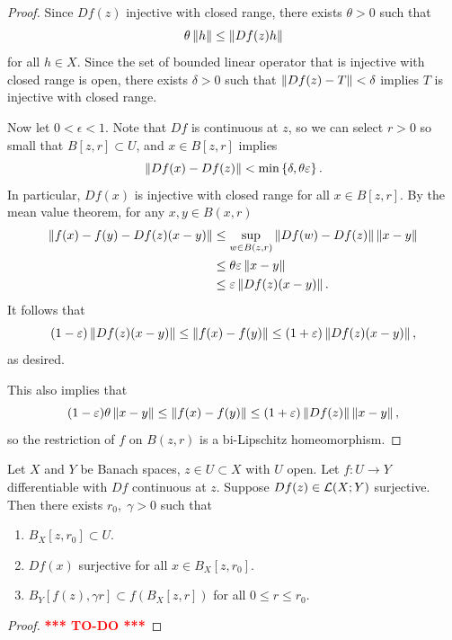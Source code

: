 \documentclass[a4paper]{article}
\newcommand{\TODO}{\textcolor{red}{\textbf{*** TO-DO ***}}}
\begin{document}
\begin{proof}

Since $Df(z)$ injective with closed range, there exists 
$\theta > 0$ such that 
\[
\theta \left\lVert h\right\rVert \leq \left\lVert Df(z) h\right\rVert
\]
for all $h \in X$. Since the set of bounded linear operator 
that is injective with closed range is open, there exists 
$\delta > 0$ such that $\left\lVert Df(z) - T\right\rVert < \delta$ implies 
$T$ is injective with closed range. 

Now let $0 < \epsilon < 1$. Note that $Df$ 
is continuous at $z$, so we can select $r > 0$ so small 
that $B[z, r] \subset U$, and $x \in B[z, r]$ implies 
\[
\left\lVert Df(x) - Df(z)\right\rVert < \min \left\{ \delta, \theta \varepsilon \right\}.
\]
In particular, $Df(x)$ is injective with closed range 
for all $x \in B[z, r]$. By the mean value theorem, 
for any $x, y \in B(x, r)$
\[
\begin{aligned}
\left\lVert f(x) - f(y) - Df(z) (x - y)\right\rVert 
&\leq \sup_{w \in B(z, r)} \left\lVert Df(w) - Df(z)\right\rVert \left\lVert x - y\right\rVert \\
&\leq \theta \varepsilon \left\lVert x - y\right\rVert \\ 
&\leq \varepsilon \left\lVert Df(z) (x - y)\right\rVert.
\end{aligned}
\]
It follows that 
\[
(1 - \varepsilon) \left\lVert Df(z)(x - y)\right\rVert 
\leq \left\lVert f(x) - f(y)\right\rVert 
\leq (1 + \varepsilon) \left\lVert Df(z) (x - y)\right\rVert,
\]
as desired.

This also implies that 
\[
(1 - \varepsilon) \theta \left\lVert x - y\right\rVert 
\leq \left\lVert f(x) - f(y)\right\rVert \leq (1 + \varepsilon)
\left\lVert Df(z)\right\rVert \left\lVert x - y\right\rVert,
\]
so the restriction of $f$ on $B(z, r)$ is a bi-Lipschitz 
homeomorphism.

\end{proof}

\begin{thm}
Let $X$ and $Y$ be Banach spaces, $z \in U \subset X$ with 
$U$ open. Let $f: U \to Y$ differentiable with 
$Df$ continuous at $z$. Suppose $Df(z) \in \mathcal{L}(X; Y)$ 
surjective. Then there exists $r_0, \; \gamma > 0$ such that 
\begin{enumerate}
  \item $B_X[z, r_0] \subset U$. 
  \item $Df(x)$ surjective for all $x \in B_X[z, r_0]$. 
  \item $B_Y[f(z), \gamma r] \subset f(B_X[z, r])$ for all 
  $0 \leq r \leq r_0$.
\end{enumerate}
\end{thm}

\begin{proof}
  
\TODO

\end{proof}
\end{document}
